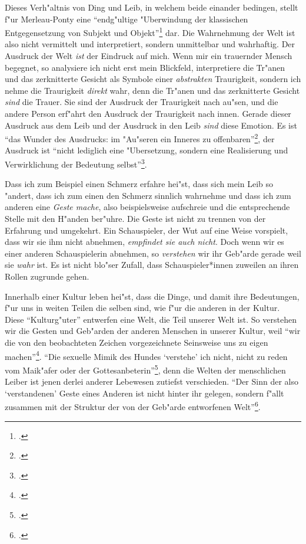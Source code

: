 \documentclass[a4paper, 12pt]{article}
\begin{document}
\begin{onehalfspace}
Dieses Verh"altnis von Ding und Leib, in welchem beide einander bedingen, stellt f"ur Merleau-Ponty eine "`endg"ultige "Uberwindung der klassischen Entgegensetzung von Subjekt und Objekt"'\footnote{\cite[S. 207]{merleau1966phanomenologie}.} dar. Die Wahrnehmung der Welt ist also nicht vermittelt und interpretiert, sondern unmittelbar und wahrhaftig. Der Ausdruck der Welt \emph{ist} der Eindruck auf mich. Wenn mir ein trauernder Mensch begegnet, so analysiere ich nicht erst mein Blickfeld, interpretiere die Tr"anen und das zerknitterte Gesicht als Symbole einer \emph{abstrakten} Traurigkeit, sondern ich nehme die Traurigkeit \emph{direkt} wahr, denn die Tr"anen und das zerknitterte Gesicht \emph{sind} die Trauer. Sie sind der Ausdruck der Traurigkeit nach au"sen, und die andere Person erf"ahrt den Ausdruck der Traurigkeit nach innen. Gerade dieser Ausdruck aus dem Leib und der Ausdruck in den Leib \emph{sind} diese Emotion. Es ist "`das Wunder des Ausdrucks: im "Au"seren ein Inneres zu offenbaren"'\footnote{\cite[S. 370]{merleau1966phanomenologie}.}, der Ausdruck ist "`nicht lediglich eine "Ubersetzung, sondern eine Realisierung und Verwirklichung der Bedeutung selbst"'\footnote{\cite[S. 217]{merleau1966phanomenologie}.}.

Dass ich zum Beispiel einen Schmerz erfahre hei"st, dass sich mein Leib so "andert, dass ich zum einen den Schmerz sinnlich wahrnehme und dass ich zum anderen eine \emph{Geste mache}, also beispielsweise aufschreie und die entsprechende Stelle mit den H"anden ber"uhre. Die Geste ist nicht zu trennen von der Erfahrung und umgekehrt. Ein Schauspieler, der Wut auf eine Weise vorspielt, dass wir sie ihm nicht abnehmen, \emph{empfindet sie auch nicht}. Doch wenn wir es einer anderen Schauspielerin abnehmen, so \emph{verstehen} wir ihr Geb"arde gerade weil sie \emph{wahr} ist. Es ist nicht blo"ser Zufall, dass Schauspieler*innen zuweilen an ihren Rollen zugrunde gehen. 

Innerhalb einer Kultur leben hei"st, dass die Dinge, und damit ihre Bedeutungen, f"ur uns in weiten Teilen die selben sind, wie f"ur die anderen in der Kultur. Diese "`Kulturg"uter"' entwerfen eine Welt, die Teil unserer Welt ist. So verstehen wir die Gesten und Geb"arden der anderen Menschen in unserer Kultur, weil "`wir die von den beobachteten Zeichen vorgezeichnete Seinsweise uns zu eigen machen"'\footnote{\cite[S. 370]{merleau1966phanomenologie}.}. "`Die sexuelle Mimik des Hundes `verstehe' ich nicht, nicht zu reden vom Maik"afer oder der Gottesanbeterin"'\footnote{\cite[S. 219]{merleau1966phanomenologie}.}, denn die Welten der menschlichen Leiber ist jenen derlei anderer Lebewesen zutiefst verschieden. "`Der Sinn der also `verstandenen' Geste eines Anderen ist nicht hinter ihr gelegen, sondern f"allt zusammen mit der Struktur der von der Geb"arde entworfenen Welt"'\footnote{\cite[S. 220]{merleau1966phanomenologie}.}.



\end{onehalfspace}
\end{document}
